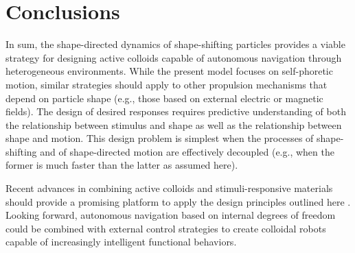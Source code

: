\section{Conclusions}  In sum, the shape-directed dynamics of shape-shifting particles provides a viable strategy for designing active colloids capable of autonomous navigation through heterogeneous environments.  While the present model focuses on self-phoretic motion, similar strategies should apply to other propulsion mechanisms that depend on particle shape (e.g., those based on external electric \autocite{Ma2015} or magnetic \autocite{Driscoll2017} fields).  The design of desired responses requires predictive understanding of both the relationship between stimulus and shape as well as the relationship  between shape and motion.  This design problem is simplest when the processes of shape-shifting and of shape-directed motion are effectively decoupled (e.g., when the former is much faster than the latter as assumed here). 

Recent advances in combining active colloids and stimuli-responsive materials should provide a promising platform to apply the design principles outlined here \autocite{Alvarez2019}.  Looking forward, autonomous navigation based on internal degrees of freedom could be combined with external control strategies \autocite{liebchen2019optimal} to create colloidal robots capable of increasingly intelligent functional behaviors.

